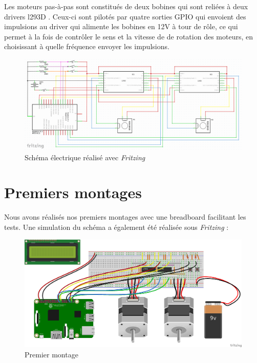 \documentclass[12pt,a4paper]{report}
\begin{document}
Les moteurs pas-à-pas sont constitués de deux bobines qui sont reliées à deux drivers l293D . Ceux-ci sont pilotés par quatre sorties GPIO qui envoient des impulsions au driver qui alimente les bobines en 12V à tour de rôle, ce qui permet à la fois de contrôler le sens et la vitesse de de rotation des moteurs, en choisissant à quelle fréquence envoyer les impulsions.
\begin{figure}[!h]
 \center
 \includegraphics[scale=0.23]{../pictures/Sudoku_schema_electrique.png}
 \caption{Schéma électrique réalisé avec \emph{Fritzing}}
\end{figure}
\newpage
\section{Premiers montages}
Nous avons réalisés nos premiers montages avec une breadboard facilitant les tests. Une simulation du schéma a également été réalisée sous \emph{Fritzing} :


\begin{figure}[!h]
 \center
 \includegraphics[scale=0.45]{../pictures/Sudoku_schema}
 \caption{Premier montage}
\end{figure}
\end{document}
